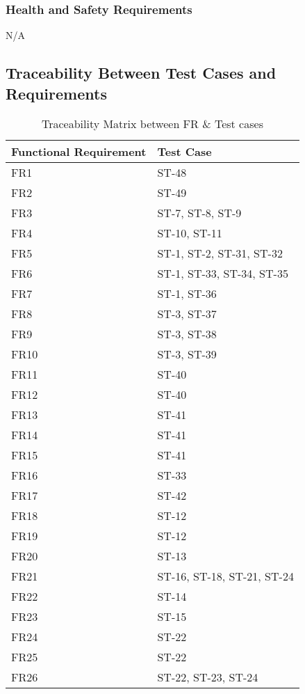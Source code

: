 \documentclass[12pt, titlepage]{article}
\begin{document}
	\subsubsection{Health and Safety Requirements}
	
	N/A
	
	\newpage
	
	\subsection{Traceability Between Test Cases and Requirements}
	
	
	\begin{longtable}{|l|l|}
		\caption{Traceability Matrix between FR \& Test cases}\\
		\hline
		Functional Requirement &  Test Case\\
		\hline
		FR1  & ST-48\\
		FR2  & ST-49\\
		FR3  & ST-7, ST-8, ST-9\\
		FR4  & ST-10, ST-11\\
		FR5  & ST-1, ST-2, ST-31, ST-32\\
		FR6  & ST-1, ST-33, ST-34, ST-35\\
		FR7  & ST-1, ST-36\\
		FR8  & ST-3, ST-37\\
		FR9  & ST-3, ST-38\\
		FR10  & ST-3, ST-39\\
		FR11  & ST-40\\
		FR12  & ST-40\\
		FR13  & ST-41\\
		FR14  & ST-41\\
		FR15  & ST-41\\
		FR16  & ST-33 \\
		FR17  & ST-42\\
		FR18  & ST-12\\
		FR19  & ST-12\\
		FR20  & ST-13\\
		FR21  & ST-16, ST-18, ST-21, ST-24\\
		FR22  & ST-14\\
		FR23  & ST-15\\
		FR24  & ST-22\\
		FR25  & ST-22\\
		\hline
		\newpage
		\hline
		FR26  & ST-22, ST-23, ST-24\\

\end{longtable}
\end{document}
